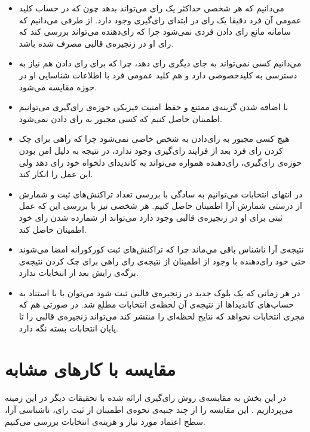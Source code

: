 \begin{itemize}
	\item 
	می‌دانیم که هر شخصی حداکثر یک رای‌ می‌تواند بدهد چون که در حساب کلید عمومی آن فرد دقیقا یک رای در ابتدای رای‌گیری وجود دارد. از طرفی می‌دانیم که سامانه مانع رای دادن فردی نمی‌شود چرا که رای‌دهنده می‌تواند بررسی کند که رای‌ او در زنجیره‌ی قالبی مصرف شده باشد.
	\item 
	می‌دانیم کسی نمی‌تواند به جای دیگری رای دهد، چرا که برای رای دادن هم نیاز به دسترسی به کلیدخصوصی دارد و هم کلید عمومی فرد با اطلاعات شناسایی او در حوزه مقایسه می‌شود.
	\item 
	با اضافه شدن گزینه‌ی ممتنع و حفظ امنیت فیزیکی حوزه‌ی رای‌گیری می‌توانیم اطمینان حاصل کنیم که کسی مجبور به رای‌ دادن نمی‌شود.
	\item 
 هیچ کسی مجبور به رای‌دادن به شخص خاصی نمی‌شود چرا که راهی برای چک کردن رای‌ فرد بعد از فرایند رای‌گیری وجود ندارد، در نتیجه به دلیل امن بودن حوزه‌ی رای‌گیری، رای‌دهنده همواره می‌تواند به کاندیدای دلخواه خود رای‌ دهد ولی این عمل را انکار کند.
	\item 
	در انتهای انتخابات می‌توانیم به سادگی با بررسی تعداد تراکنش‌های ثبت و شمارش از درستی شمارش آرا اطمینان حاصل کنیم. هر شخصی نیز با بررسی این که عمل ثبتی برای او در زنجیره‌ی قالبی وجود دارد می‌تواند از شمارده شدن رای خود اطمینان حاصل کند.
	\item 
	نتیجه‌ی آرا ناشناس  باقی می‌ماند چرا که تراکنش‌های ثبت کورکورانه امضا می‌شوند حتی خود رای‌دهنده با وجود از اطمینان از نتیجه‌ی رای راهی برای چک کردن نتیجه‌ی برگه‌ی رایش بعد از انتخابات ندارد.
	\item 
	در هر زمانی که یک بلوک جدید در زنجیره‌ی قالبی ثبت شود می‌توان با با استناد به حساب‌های کاندیداها از نتیجه‌ی آن لحظه‌ی انتخابات مطلع شد. در صورتی هم که مجری انتخابات نخواهد که نتایج لحظه‌ای را منتشر کند می‌تواند زنجیره‌ی قالبی را تا پایان انتخابات بسته نگه دارد. 
\end{itemize}




\section{مقایسه با کارهای مشابه}
در این بخش به مقایسه‌‌ی روش رای‌گیری ارائه شده با تحقیقات دیگر در این زمینه می‌پردازیم . این مقایسه را از چند جنبه‌ی نحوه‌ی اطمینان از ثبت رای، ناشناسی آرا،  سطح اعتماد مورد نیاز و  هزینه‌ی انتخابات بررسی می‌کنیم. 
